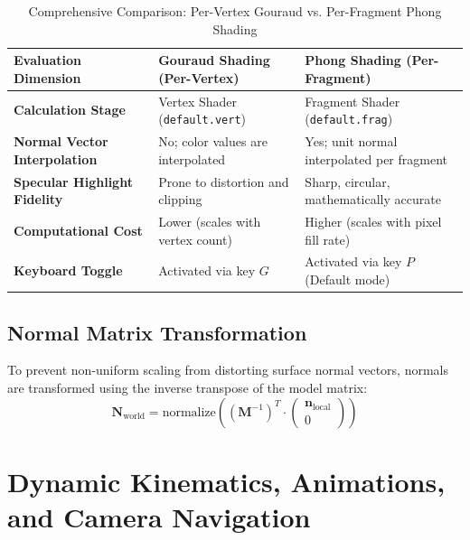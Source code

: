 \documentclass[11pt,a4paper]{article}
\begin{document}
\begin{table}[H]
\centering
\scriptsize
\caption{Comprehensive Comparison: Per-Vertex Gouraud vs. Per-Fragment Phong Shading}
\label{tab:gouraud_vs_phong}
\begin{tabularx}{\textwidth}{p{3.2cm}p{4.5cm}p{4.8cm}}
\toprule
\rowcolor{tableheader}
\textcolor{tableheadertext}{\textbf{Evaluation Dimension}} & 
\textcolor{tableheadertext}{\textbf{Gouraud Shading (Per-Vertex)}} & 
\textcolor{tableheadertext}{\textbf{Phong Shading (Per-Fragment)}} \\
\midrule
\rowcolor{lightgraybg}
\textbf{Calculation Stage} & Vertex Shader (\texttt{default.vert}) & Fragment Shader (\texttt{default.frag}) \\
\textbf{Normal Vector Interpolation} & No; color values are interpolated & Yes; unit normal interpolated per fragment \\
\rowcolor{lightgraybg}
\textbf{Specular Highlight Fidelity} & Prone to distortion and clipping & Sharp, circular, mathematically accurate \\
\textbf{Computational Cost} & Lower (scales with vertex count) & Higher (scales with pixel fill rate) \\
\rowcolor{lightgraybg}
\textbf{Keyboard Toggle} & Activated via key $G$ & Activated via key $P$ (Default mode) \\
\bottomrule
\end{tabularx}
\end{table}

\subsection{Normal Matrix Transformation}
To prevent non-uniform scaling from distorting surface normal vectors, normals are transformed using the inverse transpose of the model matrix:
\begin{equation}
    \mathbf{N}_{\text{world}} = \text{normalize}\left(\left(\mathbf{M}^{-1}\right)^T \cdot \begin{pmatrix} \mathbf{n}_{\text{local}} \\ 0 \end{pmatrix}\right)
\end{equation}




\section{Dynamic Kinematics, Animations, and Camera Navigation}
\end{document}
